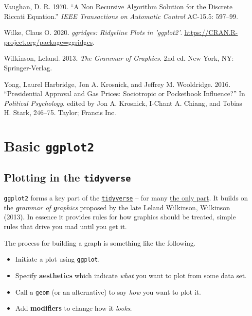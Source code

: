 \documentclass[
  letterpaper,
]{book}
\providecommand{\tightlist}{%
  \setlength{\itemsep}{0pt}\setlength{\parskip}{0pt}}\usepackage{longtable,booktabs,array}
\newlength{\cslhangindent}
\newlength{\cslentryspacingunit} %
\newenvironment{CSLReferences}[2] %
 {%
  \setlength{\parindent}{0pt}
  \ifodd #1
  \let\oldpar\par
  \def\par{\hangindent=\cslhangindent\oldpar}
  \fi
  \setlength{\parskip}{#2\cslentryspacingunit}
 }%
 {}
\begin{document}
\begin{CSLReferences}{1}{0}
\leavevmode{}%
Vaughan, D. R. 1970. {``A Non Recursive Algorithm Solution for the
Discrete Riccati Equation.''} \emph{IEEE Transactions on Automatic
Control} AC-15.5: 597--99.

\leavevmode{}%
Wilke, Claus O. 2020. \emph{{ggridges}: Ridgeline Plots in {'ggplot2'}}.
\url{https://CRAN.R-project.org/package=ggridges}.

\leavevmode{}%
Wilkinson, Leland. 2013. \emph{The Grammar of Graphics}. 2nd ed. New
York, NY: Springer-Verlag.

\leavevmode{}%
Yong, Laurel Harbridge, Jon A. Krosnick, and Jeffrey M. Wooldridge.
2016. {``Presidential Approval and Gas Prices: Sociotropic or Pocketbook
Influence?''} In \emph{Political Psychology}, edited by Jon A. Krosnick,
I-Chant A. Chiang, and Tobias H. Stark, 246--75. Taylor; Francis Inc.

\end{CSLReferences}

\cleardoublepage
{}
{}
\appendix

\hypertarget{basic-ggplot2}{%
\chapter{\texorpdfstring{Basic
\texttt{ggplot2}}{Basic ggplot2}}\label{basic-ggplot2}}

\hypertarget{plotting-in-the-tidyverse}{%
\section{\texorpdfstring{Plotting in the
\texttt{tidyverse}}{Plotting in the tidyverse}}\label{plotting-in-the-tidyverse}}

\texttt{ggplot2} forms a key part of the
\href{https://www.tidyverse.org/}{\texttt{tidyverse}}
-- for many \href{https://en.wikipedia.org/wiki/ggplot2}{the only part}.
It builds on the \emph{\textbf{g}rammar of \textbf{g}raphics} proposed
by the late Leland Wilkinson, Wilkinson (2013). In essence it provides
rules for how graphics should be treated, simple rules that drive you
mad until you get it.

The process for building a graph is something like the following.

\begin{itemize}
\tightlist
\item
  Initiate a plot using \texttt{ggplot}.
\item
  Specify \textbf{aesthetics} which indicate \emph{what} you want to
  plot from some data set.
\item
  Call a \texttt{geom} (or an alternative) to say \emph{how} you want to
  plot it.
\item
  Add \textbf{modifiers} to change how it \emph{looks}.
\end{itemize}
\end{document}

